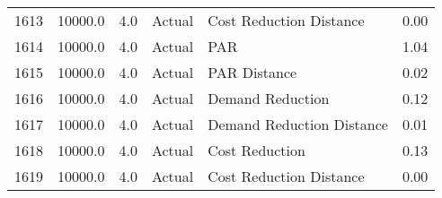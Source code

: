 \begin{longtable}{lrrllr}
1613 &      10000.0 &     4.0 &         Actual &    Cost Reduction Distance &   0.00 \\
1614 &      10000.0 &     4.0 &         Actual &                        PAR &   1.04 \\
1615 &      10000.0 &     4.0 &         Actual &               PAR Distance &   0.02 \\
1616 &      10000.0 &     4.0 &         Actual &           Demand Reduction &   0.12 \\
1617 &      10000.0 &     4.0 &         Actual &  Demand Reduction Distance &   0.01 \\
1618 &      10000.0 &     4.0 &         Actual &             Cost Reduction &   0.13 \\
1619 &      10000.0 &     4.0 &         Actual &    Cost Reduction Distance &   0.00 \\
\end{longtable}
